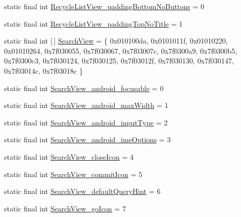 \begin{DoxyCompactItemize}
\item 
static final int \mbox{\hyperlink{classandroid_1_1support_1_1v7_1_1appcompat_1_1R_1_1styleable_ae54b9f42cce37f8fdd340a9401548942}{Recycle\+List\+View\+\_\+padding\+Bottom\+No\+Buttons}} = 0
\item 
static final int \mbox{\hyperlink{classandroid_1_1support_1_1v7_1_1appcompat_1_1R_1_1styleable_ad34edee58427a47969dad87c706d3b56}{Recycle\+List\+View\+\_\+padding\+Top\+No\+Title}} = 1
\item 
static final int \mbox{[}$\,$\mbox{]} \mbox{\hyperlink{classandroid_1_1support_1_1v7_1_1appcompat_1_1R_1_1styleable_a01af09df9e38f1e4f57165c3d3cee9fe}{Search\+View}} = \{ 0x010100da, 0x0101011f, 0x01010220, 0x01010264, 0x7f030055, 0x7f030067, 0x7f03007c, 0x7f0300a9, 0x7f0300b5, 0x7f0300c3, 0x7f030124, 0x7f030125, 0x7f03012f, 0x7f030130, 0x7f030147, 0x7f03014c, 0x7f03018c \}
\item 
static final int \mbox{\hyperlink{classandroid_1_1support_1_1v7_1_1appcompat_1_1R_1_1styleable_a45075e501403be7f1c519d24590d6ebf}{Search\+View\+\_\+android\+\_\+focusable}} = 0
\item 
static final int \mbox{\hyperlink{classandroid_1_1support_1_1v7_1_1appcompat_1_1R_1_1styleable_a66c04bc25e3cfb1261d1c3bcad618e05}{Search\+View\+\_\+android\+\_\+max\+Width}} = 1
\item 
static final int \mbox{\hyperlink{classandroid_1_1support_1_1v7_1_1appcompat_1_1R_1_1styleable_a87e050ae0c55c9b057b45f75640c7c72}{Search\+View\+\_\+android\+\_\+input\+Type}} = 2
\item 
static final int \mbox{\hyperlink{classandroid_1_1support_1_1v7_1_1appcompat_1_1R_1_1styleable_a86077545d06043426ecaf7b7618bd254}{Search\+View\+\_\+android\+\_\+ime\+Options}} = 3
\item 
static final int \mbox{\hyperlink{classandroid_1_1support_1_1v7_1_1appcompat_1_1R_1_1styleable_abf9748b43d19825a799c65ba6b586e77}{Search\+View\+\_\+close\+Icon}} = 4
\item 
static final int \mbox{\hyperlink{classandroid_1_1support_1_1v7_1_1appcompat_1_1R_1_1styleable_ae7eb07c9d9ceef69e24d78377a5f1ab0}{Search\+View\+\_\+commit\+Icon}} = 5
\item 
static final int \mbox{\hyperlink{classandroid_1_1support_1_1v7_1_1appcompat_1_1R_1_1styleable_a465ed1131f3cdafe7c1d17b3199929ae}{Search\+View\+\_\+default\+Query\+Hint}} = 6
\item 
static final int \mbox{\hyperlink{classandroid_1_1support_1_1v7_1_1appcompat_1_1R_1_1styleable_ace5391914c505cdcc0735cfccf912402}{Search\+View\+\_\+go\+Icon}} = 7

\end{DoxyCompactItemize}

